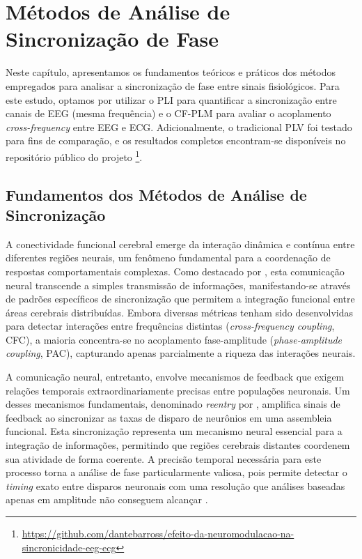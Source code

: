 \chapter{Métodos de Análise de Sincronização de Fase}
\label{chap:6_metodos_de_analise_de_sincronizacao_de_fase}
Neste capítulo, apresentamos os fundamentos teóricos e práticos dos métodos empregados para analisar a sincronização de fase entre sinais fisiológicos. Para este estudo, optamos por utilizar o PLI para quantificar a sincronização entre canais de EEG (mesma frequência) e o CF-PLM para avaliar o acoplamento \textit{cross-frequency} entre EEG e ECG. Adicionalmente, o tradicional PLV foi testado para fins de comparação, e os resultados completos encontram-se disponíveis no repositório público do projeto \cite{barros2025repository}\footnote{\url{https://github.com/dantebarross/efeito-da-neuromodulacao-na-sincronicidade-eeg-ecg}}.

\section{Fundamentos dos Métodos de Análise de Sincronização}
A conectividade funcional cerebral emerge da interação dinâmica e contínua entre diferentes regiões neurais, um fenômeno fundamental para a coordenação de respostas comportamentais complexas. Como destacado por , esta comunicação neural transcende a simples transmissão de informações, manifestando-se através de padrões específicos de sincronização que permitem a integração funcional entre áreas cerebrais distribuídas. Embora diversas métricas tenham sido desenvolvidas para detectar interações entre frequências distintas (\textit{cross-frequency coupling}, CFC), a maioria concentra-se no acoplamento fase-amplitude (\textit{phase-amplitude coupling}, PAC), capturando apenas parcialmente a riqueza das interações neurais.

A comunicação neural, entretanto, envolve mecanismos de feedback que exigem relações temporais extraordinariamente precisas entre populações neuronais. Um desses mecanismos fundamentais, denominado \emph{reentry} por , amplifica sinais de feedback ao sincronizar as taxas de disparo de neurônios em uma assembleia funcional. Esta sincronização representa um mecanismo neural essencial para a integração de informações, permitindo que regiões cerebrais distantes coordenem sua atividade de forma coerente. A precisão temporal necessária para este processo torna a análise de fase particularmente valiosa, pois permite detectar o \textit{timing} exato entre disparos neuronais com uma resolução que análises baseadas apenas em amplitude não conseguem alcançar \cite{seraj2018cerebral, ren2022multi}.


